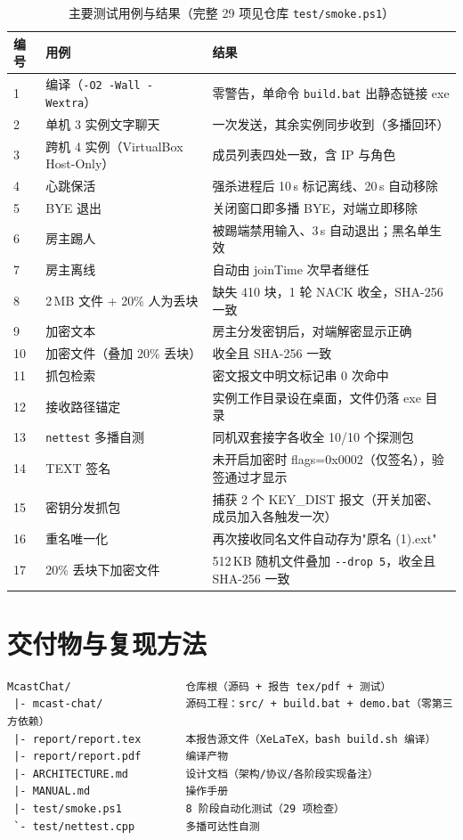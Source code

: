 \documentclass[11pt,a4paper,fontset=fandol]{ctexart}
\begin{document}
\begin{table}[H]
\centering\footnotesize
\begin{tabularx}{0.98\textwidth}{p{0.6cm}Xl}
\toprule
编号 & 用例 & 结果 \\
\midrule
1 & 编译（\texttt{-O2 -Wall -Wextra}） & 零警告，单命令 \texttt{build.bat} 出静态链接 exe \\
2 & 单机 3 实例文字聊天 & 一次发送，其余实例同步收到（多播回环） \\
3 & 跨机 4 实例（VirtualBox Host-Only） & 成员列表四处一致，含 IP 与角色 \\
4 & 心跳保活 & 强杀进程后 10\,s 标记离线、20\,s 自动移除 \\
5 & BYE 退出 & 关闭窗口即多播 BYE，对端立即移除 \\
6 & 房主踢人 & 被踢端禁用输入、3\,s 自动退出；黑名单生效 \\
7 & 房主离线 & 自动由 joinTime 次早者继任 \\
8 & 2\,MB 文件 + 20\% 人为丢块 & 缺失 410 块，1 轮 NACK 收全，SHA-256 一致 \\
9 & 加密文本 & 房主分发密钥后，对端解密显示正确 \\
10 & 加密文件（叠加 20\% 丢块） & 收全且 SHA-256 一致 \\
11 & 抓包检索 & 密文报文中明文标记串 0 次命中 \\
12 & 接收路径锚定 & 实例工作目录设在桌面，文件仍落 exe 目录 \\
13 & \texttt{nettest} 多播自测 & 同机双套接字各收全 10/10 个探测包 \\
14 & TEXT 签名 & 未开启加密时 flags=0x0002（仅签名），验签通过才显示 \\
15 & 密钥分发抓包 & 捕获 2 个 KEY\_DIST 报文（开关加密、成员加入各触发一次） \\
16 & 重名唯一化 & 再次接收同名文件自动存为"原名 (1).ext" \\
17 & 20\% 丢块下加密文件 & 512\,KB 随机文件叠加 \texttt{-{}-drop 5}，收全且 SHA-256 一致 \\
\bottomrule
\end{tabularx}
\caption{主要测试用例与结果（完整 29 项见仓库 \texttt{test/smoke.ps1}）}
\label{tab:cases}
\end{table}

\section{交付物与复现方法}

\begin{lstlisting}[caption={交付物与一键复现}]
McastChat/                  仓库根（源码 + 报告 tex/pdf + 测试）
 |- mcast-chat/             源码工程：src/ + build.bat + demo.bat（零第三方依赖）
 |- report/report.tex       本报告源文件（XeLaTeX，bash build.sh 编译）
 |- report/report.pdf       编译产物
 |- ARCHITECTURE.md         设计文档（架构/协议/各阶段实现备注）
 |- MANUAL.md               操作手册
 |- test/smoke.ps1          8 阶段自动化测试（29 项检查）
 `- test/nettest.cpp        多播可达性自测
\end{lstlisting}
\end{document}
